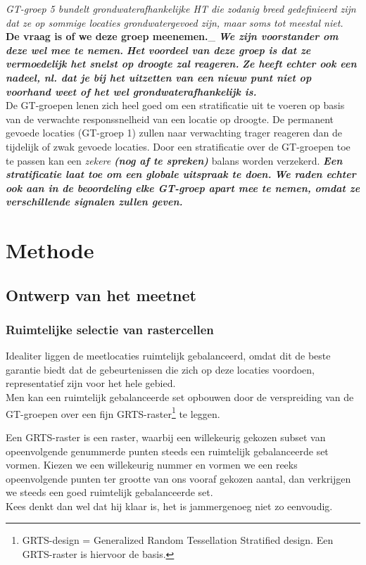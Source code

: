 \documentclass[11pt,]{book}
\let\rmarkdownfootnote\footnote%
\def\footnote{\protect\rmarkdownfootnote}
\begin{document}
\emph{GT-groep 5 bundelt grondwaterafhankelijke HT die zodanig breed
gedefinieerd zijn dat ze op sommige locaties grondwatergevoed zijn, maar
soms tot meestal niet. }\textbf{De vraag is of we deze groep
meenemen.}\_ \emph{\textbf{We zijn voorstander om deze wel mee te
nemen.}} \emph{\textbf{Het voordeel van deze groep is dat ze
vermoedelijk het snelst op droogte zal reageren.}} \emph{\textbf{Ze
heeft echter ook een nadeel, nl. dat je bij het uitzetten van een nieuw
punt niet op voorhand weet of het wel grondwaterafhankelijk is.}}\\
De GT-groepen lenen zich heel goed om een stratificatie uit te voeren op
basis van de verwachte responssnelheid van een locatie op droogte. De
permanent gevoede locaties (GT-groep 1) zullen naar verwachting trager
reageren dan de tijdelijk of zwak gevoede locaties. Door een
stratificatie over de GT-groepen toe te passen kan een \emph{zekere}
\textbf{\emph{(nog af te spreken)}} balans worden verzekerd.
\textbf{\emph{Een stratificatie laat toe om een globale uitspraak te
doen.}} \textbf{\emph{We raden echter ook aan in de beoordeling elke
GT-groep apart mee te nemen, omdat ze verschillende signalen zullen
geven.}}

\chapter{Methode}\label{methode}

\section{Ontwerp van het meetnet}\label{ontwerp-van-het-meetnet}

\subsection{Ruimtelijke selectie van
rastercellen}\label{ruimte-sel-raster}

Idealiter liggen de meetlocaties ruimtelijk gebalanceerd, omdat dit de
beste garantie biedt dat de gebeurtenissen die zich op deze locaties
voordoen, representatief zijn voor het hele gebied.\\
Men kan een ruimtelijk gebalanceerde set opbouwen door de verspreiding
van de GT-groepen over een fijn GRTS-raster\footnote{GRTS-design =
  Generalized Random Tessellation Stratified design. Een GRTS-raster is
  hiervoor de basis.} te leggen.

Een GRTS-raster is een raster, waarbij een willekeurig gekozen subset
van opeenvolgende genummerde punten steeds een ruimtelijk gebalanceerde
set vormen. Kiezen we een willekeurig nummer en vormen we een reeks
opeenvolgende punten ter grootte van ons vooraf gekozen aantal, dan
verkrijgen we steeds een goed ruimtelijk gebalanceerde set.\\
Kees denkt dan wel dat hij klaar is, het is jammergenoeg niet zo
eenvoudig.
\end{document}
